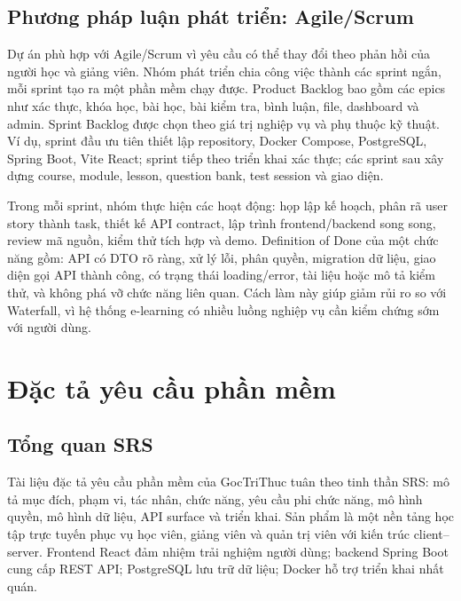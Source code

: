 \documentclass[12pt,a4paper]{report}
\newcommand{\projectname}{GocTriThuc}
\begin{document}
\section{Phương pháp luận phát triển: Agile/Scrum}
Dự án phù hợp với Agile/Scrum vì yêu cầu có thể thay đổi theo phản hồi của người học và giảng viên. Nhóm phát triển chia công việc thành các sprint ngắn, mỗi sprint tạo ra một phần mềm chạy được. Product Backlog bao gồm các epics như xác thực, khóa học, bài học, bài kiểm tra, bình luận, file, dashboard và admin. Sprint Backlog được chọn theo giá trị nghiệp vụ và phụ thuộc kỹ thuật. Ví dụ, sprint đầu ưu tiên thiết lập repository, Docker Compose, PostgreSQL, Spring Boot, Vite React; sprint tiếp theo triển khai xác thực; các sprint sau xây dựng course, module, lesson, question bank, test session và giao diện.

Trong mỗi sprint, nhóm thực hiện các hoạt động: họp lập kế hoạch, phân rã user story thành task, thiết kế API contract, lập trình frontend/backend song song, review mã nguồn, kiểm thử tích hợp và demo. Definition of Done của một chức năng gồm: API có DTO rõ ràng, xử lý lỗi, phân quyền, migration dữ liệu, giao diện gọi API thành công, có trạng thái loading/error, tài liệu hoặc mô tả kiểm thử, và không phá vỡ chức năng liên quan. Cách làm này giúp giảm rủi ro so với Waterfall, vì hệ thống e-learning có nhiều luồng nghiệp vụ cần kiểm chứng sớm với người dùng.

\chapter{Đặc tả yêu cầu phần mềm}

\section{Tổng quan SRS}
Tài liệu đặc tả yêu cầu phần mềm của \projectname{} tuân theo tinh thần SRS: mô tả mục đích, phạm vi, tác nhân, chức năng, yêu cầu phi chức năng, mô hình quyền, mô hình dữ liệu, API surface và triển khai. Sản phẩm là một nền tảng học tập trực tuyến phục vụ học viên, giảng viên và quản trị viên với kiến trúc client--server. Frontend React đảm nhiệm trải nghiệm người dùng; backend Spring Boot cung cấp REST API; PostgreSQL lưu trữ dữ liệu; Docker hỗ trợ triển khai nhất quán.
\end{document}

